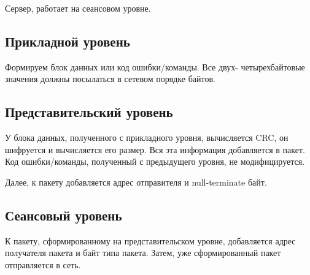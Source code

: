\documentclass[a4paper,12pt]{report}
\begin{document}
Сервер, работает на сеансовом уровне.

\subsection*{Прикладной уровень}
Формируем блок данных или код ошибки/команды. Все двух- четырехбайтовые значения должны посылаться в 
сетевом порядке байтов.

\subsection*{Представительский уровень}
У блока данных, полученного с прикладного уровня, вычисляется CRC, он шифруется и вычисляется его размер. Вся эта информация 
добавляется в пакет. Код ошибки/команды, полученный с предыдущего уровня, не модифицируется.

Далее, к пакету добавляется адрес отправителя и null-terminate байт.

\subsection*{Сеансовый уровень}
К пакету, сформированному на представительском уровне, добавляется адрес получателя пакета и байт типа пакета. 
Затем, уже сформированный пакет отправляется в сеть.
\end{document}
